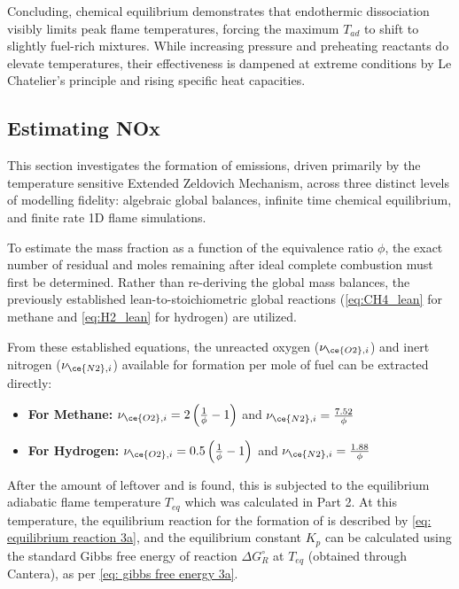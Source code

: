 Concluding, chemical equilibrium demonstrates that endothermic dissociation visibly limits peak flame temperatures, forcing the maximum $T_{ad}$ to shift to slightly fuel-rich mixtures. While increasing pressure and preheating reactants do elevate temperatures, their effectiveness is dampened at extreme conditions by Le Chatelier's principle and rising specific heat capacities.


\subsection{Estimating NOx}

This section investigates the formation of  emissions, driven primarily by the temperature sensitive Extended Zeldovich Mechanism, across three distinct levels of modelling fidelity: algebraic global balances, infinite time chemical equilibrium, and finite rate 1D flame simulations.

To estimate the  mass fraction as a function of the equivalence ratio $\phi$, the exact number of residual  and  moles remaining after ideal complete combustion must first be determined. Rather than re-deriving the global mass balances, the previously established lean-to-stoichiometric global reactions (\autoref{eq:CH4_lean} for methane and \autoref{eq:H2_lean} for hydrogen) are utilized. 

From these established equations, the unreacted oxygen ($\nu_{\ce{O2},i}$) and inert nitrogen ($\nu_{\ce{N2},i}$) available for  formation per mole of fuel can be extracted directly:
\begin{itemize}
    \item \textbf{For Methane:} $\nu_{\ce{O2},i} = 2 \left(\frac{1}{\phi} - 1\right)$ and $\nu_{\ce{N2},i} = \frac{7.52}{\phi}$
    \item \textbf{For Hydrogen:} $\nu_{\ce{O2},i} = 0.5 \left(\frac{1}{\phi} - 1\right)$ and $\nu_{\ce{N2},i} = \frac{1.88}{\phi}$
\end{itemize}

After the amount of leftover  and  is found, this is subjected to the equilibrium adiabatic flame temperature $T_{eq}$ which was calculated in Part 2. At this temperature, the equilibrium reaction for the formation of  is described by \autoref{eq: equilibrium reaction 3a}, and the equilibrium constant $K_p$ can be calculated using the standard Gibbs free energy of reaction $\Delta G_{R} ^{\circ}$ at $T_{eq}$ (obtained through Cantera), as per \autoref{eq: gibbs free energy 3a}. 

